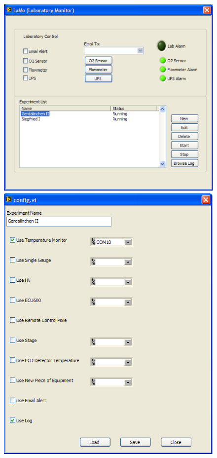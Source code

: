 \begin{figure}[tbhp]
  \centering
  \includegraphics[height=0.23\textheight]{LaMoLab}\hfil
  \includegraphics[height=0.23\textheight]{LaMoEdit}\hfil

\end{figure}
